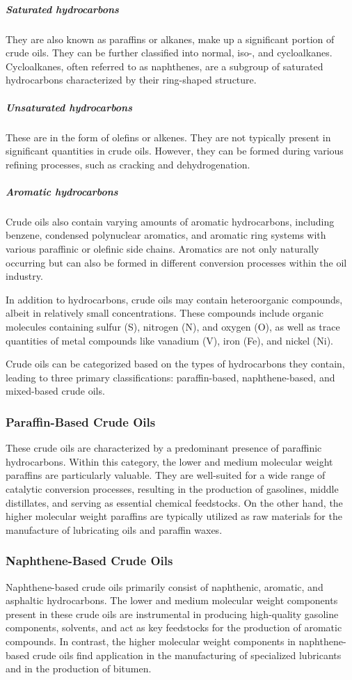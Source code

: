 \subparagraph{Saturated hydrocarbons} They are also known as paraffins or alkanes, make up a significant portion of crude oils.
They can be further classified into normal, iso-, and cycloalkanes.
Cycloalkanes, often referred to as naphthenes, are a subgroup of saturated hydrocarbons characterized by their ring-shaped structure.

\subparagraph{Unsaturated hydrocarbons} These are in the form of olefins or alkenes.
They are not typically present in significant quantities in crude oils.
However, they can be formed during various refining processes, such as cracking and dehydrogenation.

\subparagraph{Aromatic hydrocarbons} Crude oils also contain varying amounts of aromatic hydrocarbons, including benzene, condensed polynuclear aromatics, and aromatic ring systems with various paraffinic or olefinic side chains.
Aromatics are not only naturally occurring but can also be formed in different conversion processes within the oil industry.

In addition to hydrocarbons, crude oils may contain heteroorganic compounds, albeit in relatively small concentrations.
These compounds include organic molecules containing sulfur (S), nitrogen (N), and oxygen (O), as well as trace quantities of metal compounds like vanadium (V), iron (Fe), and nickel (Ni).

Crude oils can be categorized based on the types of hydrocarbons they contain, leading to three primary classifications: paraffin-based, naphthene-based, and mixed-based crude oils.

\subsubsection{Paraffin-Based Crude Oils}
These crude oils are characterized by a predominant presence of paraffinic hydrocarbons.
Within this category, the lower and medium molecular weight paraffins are particularly valuable.
They are well-suited for a wide range of catalytic conversion processes, resulting in the production of gasolines, middle distillates, and serving as essential chemical feedstocks.
On the other hand, the higher molecular weight paraffins are typically utilized as raw materials for the manufacture of lubricating oils and paraffin waxes.

\subsubsection{Naphthene-Based Crude Oils}
Naphthene-based crude oils primarily consist of naphthenic, aromatic, and asphaltic hydrocarbons.
The lower and medium molecular weight components present in these crude oils are instrumental in producing high-quality gasoline components, solvents, and act as key feedstocks for the production of aromatic compounds.
In contrast, the higher molecular weight components in naphthene-based crude oils find application in the manufacturing of specialized lubricants and in the production of bitumen.

